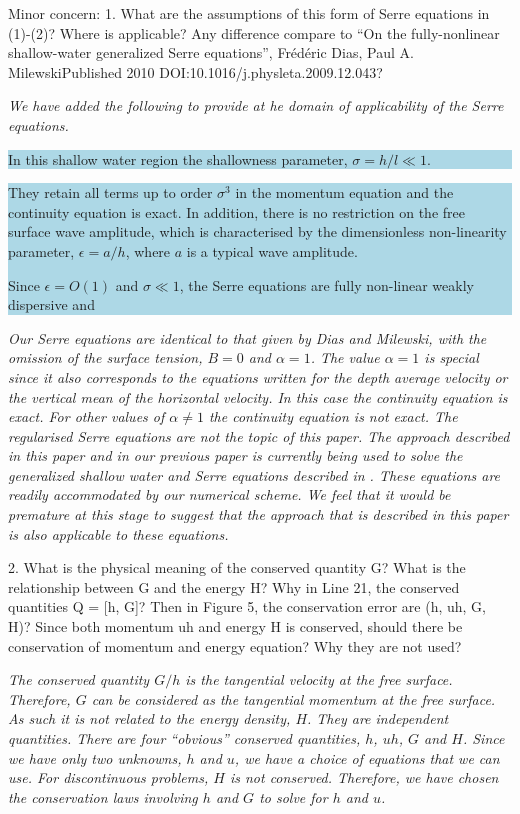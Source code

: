 \documentclass[subeqn]{article}
\newcommand{\hlb}[1] {\par\colorbox{lightblue}{\parbox{\linewidth}{#1}}}
\begin{document}
Minor concern:
1. What are the assumptions of this form of Serre equations in (1)-(2)? Where is applicable? Any difference compare to “On the fully-nonlinear shallow-water generalized Serre equations”, Frédéric Dias, Paul A. MilewskiPublished 2010 DOI:10.1016/j.physleta.2009.12.043?

\emph{We have added the following to provide at he domain of applicability of the Serre equations.}
\hlb{In this shallow water region the shallowness parameter, $\sigma = h/l \ll 1$.}

\hlb{They  retain all terms up to order $\sigma^3$ in the momentum equation and the continuity equation is exact. In addition, there is no restriction on the free surface wave amplitude, which is characterised by the dimensionless non-linearity parameter, $\epsilon = a/h$, where $a$ is a typical wave amplitude.

Since $\epsilon = O(1)$ and $\sigma \ll 1$, the Serre equations are fully non-linear weakly dispersive and}

\emph{Our Serre equations are identical to that given by Dias and Milewski\cite{Dias-Milewski-2010-1049}, with the omission of the surface tension, $B = 0$ and $\alpha = 1$. The value $\alpha = 1$ is special since it also corresponds to the equations written for the depth average velocity or the vertical mean of the horizontal velocity. In this case the continuity equation is exact. For other values of $\alpha \ne 1$ the continuity equation is not exact. The regularised Serre equations are not the topic of this paper. The approach described in this paper and in our previous paper is currently being used to solve the generalized shallow water and Serre equations described in \cite{Clamond-Dutykh-2018-237,Dias-Milewski-2010-1049,Dutykh-etal-2018-371}. These equations are readily accommodated by our numerical scheme. We feel that it would be premature at this stage to suggest that the approach that is described in this paper is also applicable to these equations.}

2. What is the physical meaning of the conserved quantity G? What is the relationship between G and the energy H? Why in Line 21, the conserved quantities Q = [h, G]? Then in Figure 5, the conservation error are (h, uh, G, H)? Since both momentum uh and energy H is conserved, should there be conservation of momentum and energy equation? Why they are not used?

\emph{The conserved quantity $G/h$ is the tangential velocity at the free surface. Therefore, $G$ can be considered as the tangential momentum at the free surface. As such it is not related to the energy density, $H$. They are independent quantities. There are four ``obvious'' conserved quantities, $h$, $uh$, $G$ and $H$. Since we have only two unknowns, $h$ and $u$, we have a choice of equations that we can use. For discontinuous problems, $H$ is not conserved. Therefore, we have chosen the conservation laws involving $h$ and $G$ to solve for $h$ and $u$.}
\end{document}
